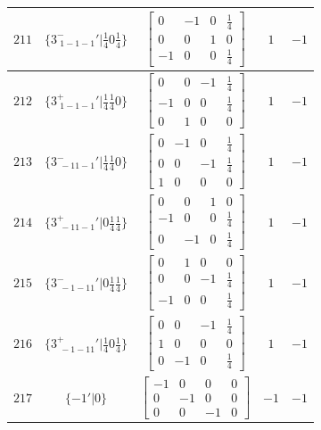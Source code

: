 \documentclass[fleqn,8pt]{jsarticle}
\begin{document}
\begin{longtable}{ccccc}
$ 211 $ & $ \{3^{-}_{\,\,1-1-1}{}'|\frac{1}{4} 0 \frac{1}{4}\} $ & $ \begin{bmatrix} 0 & -1 & 0 & \frac{1}{4} \\ 0 & 0 & 1 & 0 \\ -1 & 0 & 0 & \frac{1}{4} \end{bmatrix} $ & $ 1 $ & $ -1 $ \\ \hline
$ 212 $ & $ \{3^{+}_{\,\,1-1-1}{}'|\frac{1}{4} \frac{1}{4} 0\} $ & $ \begin{bmatrix} 0 & 0 & -1 & \frac{1}{4} \\ -1 & 0 & 0 & \frac{1}{4} \\ 0 & 1 & 0 & 0 \end{bmatrix} $ & $ 1 $ & $ -1 $ \\ \hline
$ 213 $ & $ \{3^{-}_{\,\,-11-1}{}'|\frac{1}{4} \frac{1}{4} 0\} $ & $ \begin{bmatrix} 0 & -1 & 0 & \frac{1}{4} \\ 0 & 0 & -1 & \frac{1}{4} \\ 1 & 0 & 0 & 0 \end{bmatrix} $ & $ 1 $ & $ -1 $ \\ \hline
$ 214 $ & $ \{3^{+}_{\,\,-11-1}{}'|0 \frac{1}{4} \frac{1}{4}\} $ & $ \begin{bmatrix} 0 & 0 & 1 & 0 \\ -1 & 0 & 0 & \frac{1}{4} \\ 0 & -1 & 0 & \frac{1}{4} \end{bmatrix} $ & $ 1 $ & $ -1 $ \\ \hline
$ 215 $ & $ \{3^{-}_{\,\,-1-11}{}'|0 \frac{1}{4} \frac{1}{4}\} $ & $ \begin{bmatrix} 0 & 1 & 0 & 0 \\ 0 & 0 & -1 & \frac{1}{4} \\ -1 & 0 & 0 & \frac{1}{4} \end{bmatrix} $ & $ 1 $ & $ -1 $ \\ \hline
$ 216 $ & $ \{3^{+}_{\,\,-1-11}{}'|\frac{1}{4} 0 \frac{1}{4}\} $ & $ \begin{bmatrix} 0 & 0 & -1 & \frac{1}{4} \\ 1 & 0 & 0 & 0 \\ 0 & -1 & 0 & \frac{1}{4} \end{bmatrix} $ & $ 1 $ & $ -1 $ \\ \hline
$ 217 $ & $ \{-1{}'|0\} $ & $ \begin{bmatrix} -1 & 0 & 0 & 0 \\ 0 & -1 & 0 & 0 \\ 0 & 0 & -1 & 0 \end{bmatrix} $ & $ -1 $ & $ -1 $ \\ \hline

\end{longtable}
\end{document}
